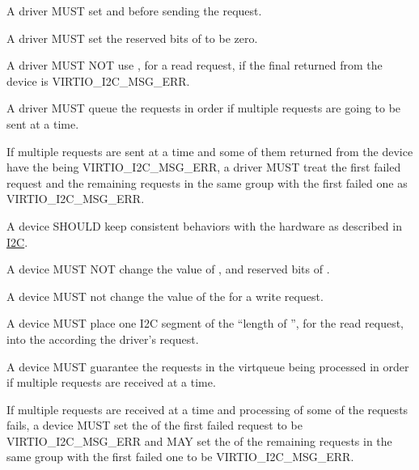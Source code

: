 
A driver MUST set  and  before sending the request.

A driver MUST set the reserved bits of  to be zero.

A driver MUST NOT use , for a read request, if the final
 returned from the device is VIRTIO_I2C_MSG_ERR.

A driver MUST queue the requests in order if multiple requests are going to
be sent at a time.

If multiple requests are sent at a time and some of them returned from the
device have the  being VIRTIO_I2C_MSG_ERR, a driver MUST treat
the first failed request and the remaining requests in the same group with
the first failed one as VIRTIO_I2C_MSG_ERR.


A device SHOULD keep consistent behaviors with the hardware as described in
\hyperref[intro:I2C]{I2C}.

A device MUST NOT change the value of , and reserved bits of
.

A device MUST not change the value of the  for a write request.

A device MUST place one I2C segment of the ``length of '', for the
read request, into the  according the driver's request.

A device MUST guarantee the requests in the virtqueue being processed in order
if multiple requests are received at a time.

If multiple requests are received at a time and processing of some of the
requests fails, a device MUST set the  of the first failed
request to be VIRTIO_I2C_MSG_ERR and MAY set the  of the
remaining requests in the same group with the first failed one
to be VIRTIO_I2C_MSG_ERR.
